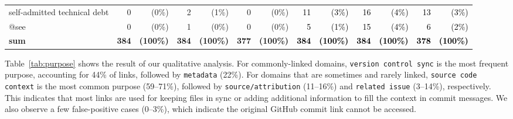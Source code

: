 \documentclass[smallextended]{svjour3}       %
\newcommand{\fix}[1]{\textcolor{black}{#1}}
\begin{document}
\begin{table}[t]
{\begin{tabular}{lr@{}rr@{}rr@{}r|r@{}rr@{}rr@{}r}
self-admitted technical debt                   & 0                             & (0\%)                             & 2                             & (1\%)                             & 0                             & (0\%)                             & \fix{11}                            & \fix{(3\%)}                             & \multicolumn{1}{r|}{\fix{16}}                            & \fix{(4\%)}                             & \fix{13}                            & \fix{(3\%)}                             \\
@see                                           & 0                             & (0\%)                             & 1                             & (0\%)                             & 0                             & (0\%)                             & \fix{5}                             & \fix{(1\%)}                             & \multicolumn{1}{r|}{\fix{15}}                            & \fix{(4\%)}                             & \fix{6}                             & \fix{(2\%)}                             \\ \midrule
\textbf{sum}                  & \textbf{384} & \textbf{(100\%)} & \textbf{384} & \textbf{(100\%)} & \textbf{377} & \textbf{(100\%)} & \fix{\textbf{384}} & \fix{\textbf{(100\%)}} & \multicolumn{1}{r|}{\fix{\textbf{384}}} & \fix{\textbf{(100\%)}} & \fix{\textbf{378}} & \fix{\textbf{(100\%)}} \\ 
\bottomrule
\end{tabular}}
\end{table}



Table~\ref{tab:purpose} shows the result of our qualitative analysis. For commonly-linked domains, \texttt{version control sync} is the most frequent purpose, accounting for 44\% of links, followed by \texttt{metadata} (22\%). For domains that are sometimes and rarely linked, \texttt{source code context} is the most common purpose (59--71\%), followed by \texttt{source/attribution} (11--16\%) and \texttt{related issue} (3--14\%), respectively. This indicates that most links are used for keeping files in sync or adding additional information to fill the context in commit messages. We also observe a few false-positive cases (0--3\%), which indicate the original GitHub commit link cannot be accessed. 


\end{document}
